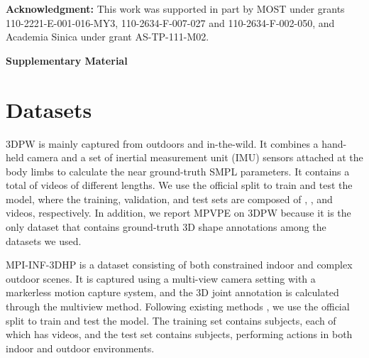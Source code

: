 \documentclass[10pt,twocolumn,letterpaper]{article}
\begin{document}
\noindent \textbf{Acknowledgment:} 
This work was supported in part by MOST under grants 110-2221-E-001-016-MY3, 110-2634-F-007-027 and 110-2634-F-002-050, and Academia Sinica under grant AS-TP-111-M02.






{\small


}


\clearpage





\pagebreak
\begin{center}
\textbf{\large Supplementary Material}
\end{center}
\makeatletter



\section{Datasets}


\iffalse
Copy and paste your Supplemental Materials text here \cite{S_RefA}, blah, blah, blah, blah, blah, blah, ...



\begin{thebibliography}{11}
\bibitem{S_RefA} A. Someone, C. Someone, D. Someone, Phys. Rev. Lett. {\bf 11}, 1111 (1911).
\end{thebibliography}

\fi


\vspace{5pt} 3DPW \cite{Marcard2018RecoveringA3} is mainly captured from outdoors and in-the-wild. It combines a hand-held camera and a set of inertial measurement unit (IMU) sensors attached at the body limbs to calculate the near ground-truth SMPL parameters. It contains a total of  videos of different lengths. We use the official split to train and test the model, where the training, validation, and test sets are composed of , , and  videos, respectively. In addition, we report MPVPE on 3DPW because it is the only dataset that contains ground-truth 3D shape annotations among the datasets we used.

\vspace{5pt} MPI-INF-3DHP \cite{Mehta2017Monocular3H} is a dataset consisting of both constrained indoor and complex outdoor scenes. It is captured using a multi-view camera setting with a markerless motion capture system, and the 3D joint annotation is calculated through the multiview method. Following existing methods \cite{Kocabas2020VIBEVI,choi2020beyond}, we use the official split to train and test the model. The training set contains  subjects, each of which has  videos, and the test set contains  subjects, performing  actions in both indoor and outdoor environments.
\end{document}
